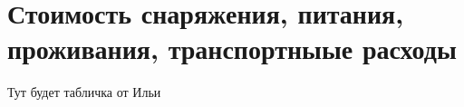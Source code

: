 \section{Стоимость снаряжения, питания, проживания, транспортныые расходы}

Тут будет табличка от Ильи

\newpage